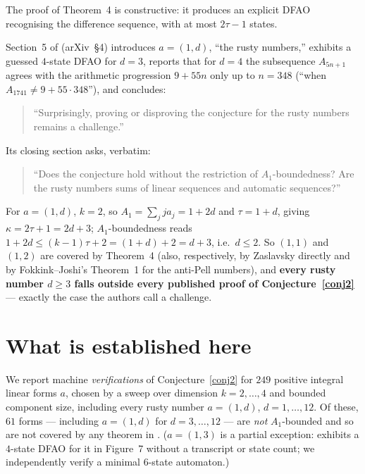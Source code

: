 \documentclass[10pt,reqno]{amsart}
\theoremstyle{plain}
\theoremstyle{definition}
\theoremstyle{remark}
\numberwithin{theorem}{section}
\begin{document}
\noindent The proof of Theorem~4 is constructive: it produces an explicit DFAO recognising the
difference sequence, with at most $2\tau-1$ states.

Section~5 of \cite{FJ} (arXiv~\S4) introduces $a=(1,d)$, ``the rusty numbers,'' exhibits a
guessed $4$-state DFAO for $d=3$, reports that for $d=4$ the subsequence $A_{5n+1}$ agrees with
the arithmetic progression $9+55n$ only up to $n=348$ (``when $A_{1741}\ne9+55\cdot348$''), and
concludes:

\begin{quote}
``Surprisingly, proving or disproving the conjecture for the rusty numbers remains a
challenge.'' \cite[\S5]{FJ}
\end{quote}

\noindent Its closing section asks, verbatim:

\begin{quote}
``Does the conjecture hold without the restriction of $A_1$-boundedness? Are the rusty numbers
sums of linear sequences and automatic sequences?'' \cite[\S6]{FJ}
\end{quote}

For $a=(1,d)$, $k=2$, so $A_1=\sum_j ja_j=1+2d$ and $\tau=1+d$, giving $\kappa=2\tau+1=2d+3$;
$A_1$-boundedness reads $1+2d\le(k-1)\tau+2=(1+d)+2=d+3$, i.e.\ $d\le2$. So $(1,1)$ and $(1,2)$
are covered by Theorem~4 (also, respectively, by Zaslavsky \cite{Zaslavsky} directly and by
Fokkink--Joshi's Theorem~1 for the anti-Pell numbers), and \textbf{every rusty number $d\ge3$
falls outside every published proof of Conjecture~\ref{conj2}} --- exactly the case the
authors call a challenge.

\section{What is established here}
\label{sec:established}

We report machine \emph{verifications} of Conjecture~\ref{conj2} for $249$ positive integral
linear forms $a$, chosen by a sweep over dimension $k=2,\dots,4$ and bounded component size,
including every rusty number $a=(1,d)$, $d=1,\dots,12$. Of these, $61$ forms --- including
$a=(1,d)$ for $d=3,\dots,12$ --- are \emph{not} $A_1$-bounded and so are not covered by any
theorem in \cite{FJ}. ($a=(1,3)$ is a partial exception: \cite{FJ} exhibits a $4$-state DFAO for
it in Figure~7 without a transcript or state count; we independently verify a minimal $6$-state
automaton.)
\end{document}
